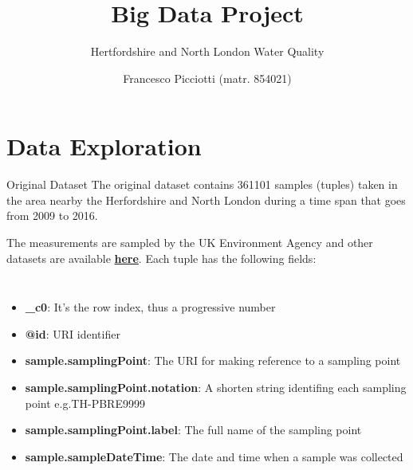 \documentclass[british]{beamer}
\begin{document}
%
\title[Big Data Project]
{Big Data Project}

\subtitle{Hertfordshire and North London Water Quality}

\author[F. Picciotti (matr.854021)]
{Francesco Picciotti (matr. 854021)}






\maketitle

\section{Data Exploration}

\begin{frame}{Original Dataset}
	The original dataset contains 361101 samples (tuples) taken in the area nearby the Herfordshire and North London during a time span that goes from 2009 to 2016.
	
	The measurements are sampled by the UK Environment Agency and other datasets are available
	\href{http://environment.data.gov.uk/water-quality/view/download}{\textbf{here}}.
	Each tuple has the following fields:
	\begin{columns}
	\begin{itemize}
		\item \textbf{\_c0}: It's the row index, thus a progressive number
		\item \textbf{@id}: URI identifier
		\item \textbf{sample.samplingPoint}: The URI for making reference to a sampling point
		\item \textbf{sample.samplingPoint.notation}: A shorten string identifing each sampling point e.g.TH-PBRE9999
		\item \textbf{sample.samplingPoint.label}: The full name of the sampling point
		\item \textbf{sample.sampleDateTime}: The date and time when a sample was collected
	\end{itemize}
	\end{columns}
\end{frame}
\end{document}
